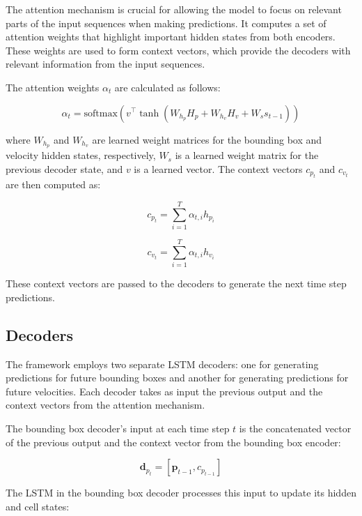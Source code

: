 \documentclass[12pt,oneside]{book} %
\begin{document}
The attention mechanism is crucial for allowing the model to focus on relevant
parts of the input sequences when making predictions. It computes a set of
attention weights that highlight important hidden states from both encoders.
These weights are used to form context vectors, which provide the decoders with
relevant information from the input sequences.

The attention weights $\alpha_t$ are calculated as follows:

\begin{equation}
    \alpha_t = \text{softmax}(v^\top \tanh(W_{h_p} H_p + W_{h_v} H_v + W_s s_{t-1}))
\end{equation}

where $W_{h_p}$ and $W_{h_v}$ are learned weight matrices for the bounding box
and velocity hidden states, respectively, $W_s$ is a learned weight matrix for
the previous decoder state, and $v$ is a learned vector. The context vectors
$c_{p_t}$ and $c_{v_t}$ are then computed as:

\begin{equation}
    c_{p_t} = \sum_{i=1}^{T} \alpha_{t,i} h_{p_i}
\end{equation}

\begin{equation}
    c_{v_t} = \sum_{i=1}^{T} \alpha_{t,i} h_{v_i}
\end{equation}

These context vectors are passed to the decoders to generate the next time step
predictions.

\subsection{Decoders}
The framework employs two separate LSTM decoders: one for generating
predictions for future bounding boxes and another for generating predictions
for future velocities. Each decoder takes as input the previous output and the
context vectors from the attention mechanism.

The bounding box decoder's input at each time step $t$ is the concatenated
vector of the previous output and the context vector from the bounding box
encoder:

\begin{equation}
    \mathbf{d}_{p_t} = [\mathbf{p}_{t-1}, c_{p_{t-1}}]
\end{equation}

The LSTM in the bounding box decoder processes this input to update its hidden
and cell states:
\end{document}
